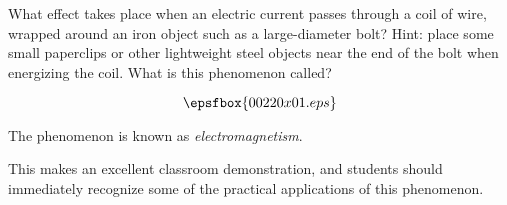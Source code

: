 

What effect takes place when an electric current passes through a coil of wire, wrapped around an iron object such as a large-diameter bolt?  Hint: place some small paperclips or other lightweight steel objects near the end of the bolt when energizing the coil.  What is this phenomenon called?

$$\epsfbox{00220x01.eps}$$







The phenomenon is known as {\it electromagnetism}.







This makes an excellent classroom demonstration, and students should immediately recognize some of the practical applications of this phenomenon.




